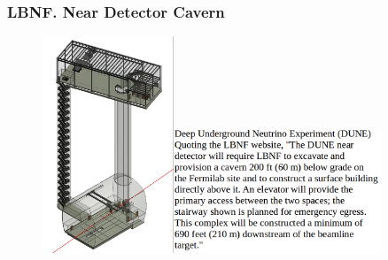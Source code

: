 \begin{frame}\frametitle{LBNF. Near Detector Cavern}
\scriptsize
\begin{figure}
\label{fig:nearDetector}
\centering
\includegraphics[width=0.35\textwidth, keepaspectratio=true]{figs/nearDetector_project.png}\includegraphics[width=0.55\textwidth, keepaspectratio=true]{figs/nearDetector_Text.png}
\end{figure}
\end{frame}


